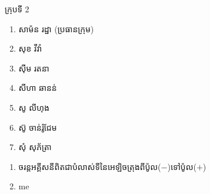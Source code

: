 \documentclass[15pt,a4paper]{article}
\author{james1}
\date{\today}
\newenvironment{kfont}{\khfont}{}
\begin{document}
\hfill\begin{minipage}{0.6\linewidth}
\begin{kfont}ក្រុបទី\end{kfont} 2
\begin{enumerate}
\item \begin{kfont}សាម៉ន រដ្ឋា (ប្រធានក្រុម)\end{kfont}
\item \begin{kfont}សុខ វីវ៉ា\end{kfont}
\item \begin{kfont}សុីម រតនា\end{kfont}
\item \begin{kfont}សីហា ឆានន់\end{kfont}
\item \begin{kfont}សូ លីហុង\end{kfont}
\item \begin{kfont}ស៊ូ ចាន់រ៉ូជែម\end{kfont}
\item \begin{kfont}សុំ សុភ័ត្រា\end{kfont}
\end{enumerate}
\end{minipage}
\begin{enumerate}
\item 
\begin{kfont}
ចរន្តអគ្គីសនីពិតជាបំលាស់ទីនៃអេឡិចត្រុងពីប៉ូល(\(-\))ទៅប៉ូល(\(+\))
\end{kfont}
\item 
me
\end{enumerate}
\end{document}
